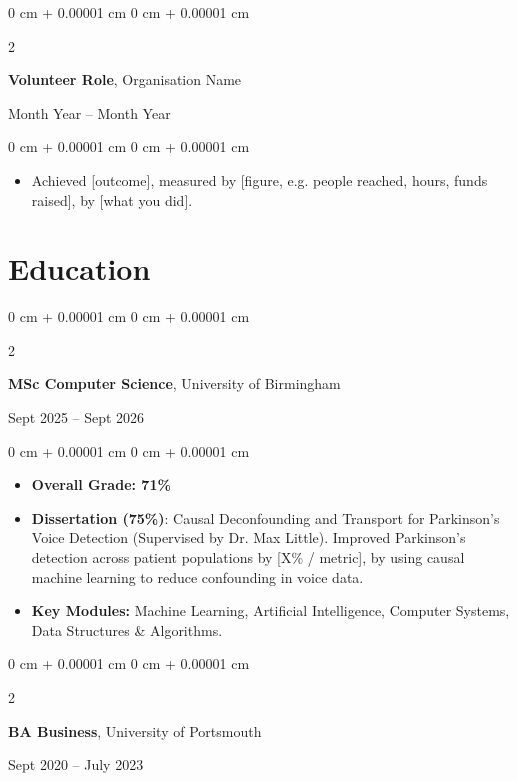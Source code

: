 \documentclass[10pt, letterpaper]{article}
\newenvironment{highlights}{
    \begin{itemize}[
        topsep=0.10 cm,
        parsep=0pt,
        partopsep=0pt,
        itemsep=0pt,
        leftmargin=0 cm + 10pt
    ]
}{
    \end{itemize}
}
\newenvironment{onecolentry}{
    \begin{adjustwidth}{
        0 cm + 0.00001 cm
    }{
        0 cm + 0.00001 cm
    }
}{
    \end{adjustwidth}
}
\newenvironment{twocolentry}[2][]{
    \onecolentry
    \def\secondColumn{#2}
    \setcolumnwidth{\fill, 4.5 cm}
    \begin{paracol}{2}
}{
    \switchcolumn \raggedleft \secondColumn
    \end{paracol}
    \endonecolentry
}
\begin{document}
\vspace{0.2 cm}

\begin{twocolentry}{
    Month Year -- Month Year
}
    \textbf{Volunteer Role}, Organisation Name
\end{twocolentry}

\vspace{0.10 cm}

\begin{onecolentry}
    \begin{highlights}
        \item Achieved [outcome], measured by [figure, e.g. people reached, hours, funds raised], by [what you did].
    \end{highlights}
\end{onecolentry}



\section{Education}

\begin{twocolentry}{
    Sept 2025 -- Sept 2026
}
    \textbf{MSc Computer Science}, University of Birmingham
\end{twocolentry}

\vspace{0.10 cm}

\begin{onecolentry}
    \begin{highlights}
        \item \textbf{Overall Grade: 71\%}
        \item \textbf{Dissertation (75\%)}: Causal Deconfounding and Transport for Parkinson's Voice Detection (Supervised by Dr. Max Little). Improved Parkinson's detection across patient populations by [X\% / metric], by using causal machine learning to reduce confounding in voice data.
        \item \textbf{Key Modules:} Machine Learning, Artificial Intelligence, Computer Systems, Data Structures \& Algorithms.
    \end{highlights}
\end{onecolentry}

\vspace{0.2 cm}

\begin{twocolentry}{
    Sept 2020 -- July 2023
}
    \textbf{BA Business}, University of Portsmouth
\end{twocolentry}
\end{document}
